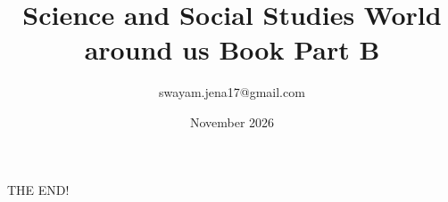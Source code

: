 \documentclass{book}
\title{Science and Social Studies World around us Book Part B}
\author{swayam.jena17@gmail.com}
\date{November 2026}
\begin{document}
\maketitle


\tableofcontents
\listoffigures
\listoftables










THE END!
\end{document}
